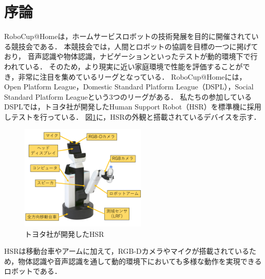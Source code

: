 \documentclass[a4j]{jarticle}
\begin{document}

\section{序論}
RoboCup@Home\cite{robocup_hp}は，ホームサービスロボットの技術発展を目的に開催されている競技会である．
本競技会では，人間とロボットの協調を目標の一つに掲げており，
音声認識や物体認識，ナビゲーションといったテストが動的環境下で行われている．
そのため，より現実に近い家庭環境で性能を評価することができ，非常に注目を集めているリーグとなっている．
RoboCup@Homeには，Open Platform League，Domestic Standard Platform League（DSPL），Social Standard Platform Leagueという3つのリーグがある．
私たちの参加しているDSPLでは，トヨタ社が開発したHuman Support Robot（HSR）\cite{hsr_paper}を標準機に採用しテストを行っている．
図\ref{overview_hsr}に，HSRの外観と搭載されているデバイスを示す．
\begin{figure}[ht]
  \centering
  \includegraphics[width=6cm]{images/hsr/hsr_explain_ja.png}
  \caption{トヨタ社が開発したHSR}
  \label{overview_hsr}
\end{figure}
HSRは移動台車やアームに加えて，RGB-Dカメラやマイクが搭載されているため，物体認識や音声認識を通して動的環境下においても多様な動作を実現できるロボットである．
\end{document}
